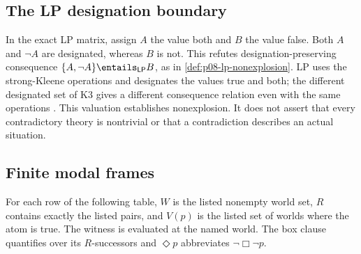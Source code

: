 \subsection{The LP designation boundary}
\label{sec:p14-counter-lp}

In the exact LP matrix, assign \(A\) the value both and \(B\) the value
false. Both \(A\) and \(\neg A\) are designated, whereas \(B\) is not.
This refutes designation-preserving consequence
\(\{A,\neg A\}\entails_{\mathsf{LP}}B\), as in
\cref{def:p08-lp-nonexplosion}. LP uses the strong-Kleene operations and
designates the values true and both; the different designated set of K3 gives
a different consequence relation even with the same operations
\cite{Priest1979}. This valuation establishes nonexplosion. It does not
assert that every contradictory theory is nontrivial or that a contradiction
describes an actual situation.

\subsection{Finite modal frames}
\label{sec:p14-counter-modal}

For each row of the following table, \(W\) is the listed nonempty world
set, \(R\) contains exactly the listed pairs, and \(V(p)\) is the listed
set of worlds where the atom is true. The witness is evaluated at the
named world. The box clause quantifies over its \(R\)-successors and
\(\Diamond p\) abbreviates \(\neg\Box\neg p\).

